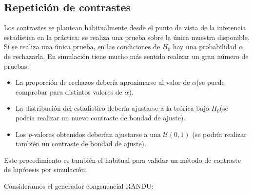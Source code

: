 \documentclass[
]{book}
\theoremstyle{break}
\theoremstyle{definition}
\theoremstyle{definition}
\theoremstyle{definition}
\theoremstyle{remark}
\let\BeginKnitrBlock\begin \let\EndKnitrBlock\end
\begin{document}
\hypertarget{repeticiuxf3n-de-contrastes}{%
\subsection{Repetición de contrastes}\label{repeticiuxf3n-de-contrastes}}

Los contrastes se plantean habitualmente desde el punto de vista de
la inferencia estadística en la práctica: se realiza una prueba
sobre la única muestra disponible. Si se realiza una única prueba,
en las condiciones de \(H_0\) hay
una probabilidad \(\alpha\) de rechazarla.
En simulación tiene mucho más sentido realizar un gran número de
pruebas:

\begin{itemize}
\item
  La proporción de rechazos debería aproximarse al valor de
  \(\alpha\)(se puede comprobar para distintos valores de \(\alpha\)).
\item
  La distribución del estadístico debería ajustarse a la teórica
  bajo \(H_0\)(se podría realizar un nuevo contraste de bondad
  de ajuste).
\item
  Los \emph{p}-valores obtenidos deberían ajustarse a una
  \(\mathcal{U}\left(0,1\right)\) (se podría realizar también un
  contraste de bondad de ajuste).
\end{itemize}

Este procedimiento es también el habitual para validar un método de
contraste de hipótesis por simulación.

\BeginKnitrBlock{example}
\protect\hypertarget{exm:unnamed-chunk-17}{}{\label{exm:unnamed-chunk-17} }
\EndKnitrBlock{example}

Consideramos el generador congruencial RANDU:
\end{document}
